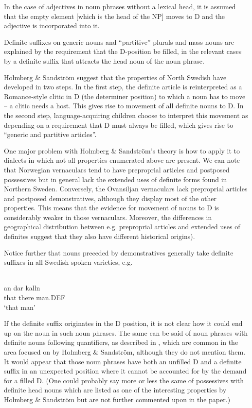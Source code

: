In the case of adjectives in noun phrases without a lexical head, it is assumed that the empty element  [which is the head of the NP] moves to D and the adjective is incorporated into it. 

Definite suffixes on generic nouns and “partitive” plurals and mass nouns are explained by the requirement that the D-position be filled, in the relevant cases by a definite suffix that attracts the head noun of the noun phrase. 

Holmberg \& Sandström suggest that the properties of North Swedish have developed in two steps. In the first step, the definite article is reinterpreted as a Romance-style clitic in D (the determiner position) to which a noun has to move – a clitic needs a host. This gives rise to movement of all definite nouns to D. In the second step, language-acquiring children choose to interpret this movement as depending on a requirement that D must always be filled, which gives rise to “generic and partitive articles”. 

One major problem with Holmberg \& Sandström’s theory is how to apply it to dialects in which not all properties enumerated above are present. We can note that Norwegian vernaculars tend to have preproprial articles and postposed possessives but in general lack the extended uses of definite forms found in Northern Sweden. Conversely, the Ovansiljan vernaculars lack preproprial articles and postposed demonstratives, although they display most of the other properties. This means that the evidence for movement of nouns to D is considerably weaker in those vernaculars. Moreover, the differences in geographical distribution between e.g. preproprial articles and extended uses of definites suggest that they also have different historical origins). 

Notice further that nouns preceded by demonstratives generally take definite suffixes in all Swedish spoken varieties, e.g.

\ea \label{} 
\\
\gll an  dar  kalln\\
that  there  man.DEF\\
\glt ‘that man’

\z

If the definite suffix originates in the D position, it is not clear how it could end up on the noun in such noun phrases. The same can be said of noun phrases with definite nouns following quantifiers, as described in , which are common in the area focused on by Holmberg \& Sandström, although they do not mention them. It would appear that those noun phrases have both an unfilled D and a definite suffix in an unexpected position where it cannot be accounted for by the demand for a filled D. (One could probably say more or less the same of possessives with definite head nouns which are listed as one of the interesting properties by Holmberg \& Sandström but are not further commented upon in the paper.)

